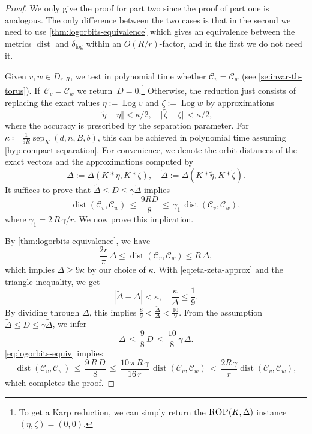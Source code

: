 \documentclass[a4paper,USenglish,cleveref,numberwithinsect]{lipics-v2021}
\DeclareMathOperator{\sep}{sep}
\DeclareMathOperator{\Log}{Log}
\DeclareMathOperator{\dist}{dist}
\newcommand{\distLD}{\delta_{\log}}
\newcommand{\KK}{\ensuremath{\mathcal{C}}}
\numberwithin{equation}{section}
\begin{document}
\begin{proof}
We only give the proof for part two since the proof of part one
is analogous. The only difference between the two cases is that in the second we need to use \cref{thm:logorbits-equivalence} which gives an equivalence between the metrics $\dist$ and $\distLD$ within an $O(R/r)$-factor, and in the first we do not need it. %

Given $v,w\in D_{r,R}$, we test in polynomial time whether
$\KK_v=\KK_w$ (see \cref{se:invar-th-torus}). %
If~$\KK_v=\KK_w$ we return~$D=0$.\footnote{To get a Karp reduction, we can simply return the $\textsc{ROP}(K,\Delta)$ instance $(\eta,\zeta)=(0,0)$.}
Otherwise, the reduction just consists of replacing the exact values
$\eta:=\Log v$ and $\zeta:=\Log w$
by approximations
\begin{equation}\label{eq:eta-zeta-approx}
  \Vert \tilde{\eta} - \eta\Vert< \kappa/2, \quad \Vert \tilde{\zeta} -\zeta\Vert < \kappa/2 ,
\end{equation}
where the accuracy is prescribed by the separation parameter.
For $\kappa\coloneqq \frac{1}{9R}\sep_K(d,n,B,b)$,
this can be achieved in polynomial time
assuming \cref{hyp:compact-separation}.
For convenience, we denote the orbit distances of the exact vectors
and the approximations computed by
$$
 \Delta:= \Delta(K\ast\eta, K\ast\zeta), \quad
 \tilde{\Delta} := \Delta(K\ast\tilde{\eta}, K\ast\tilde{\zeta}) .
$$
It suffices to prove that
$\tilde{\Delta} \leq D\leq \gamma \tilde{\Delta}$
implies
\[
  \dist(\KK_v,\KK_w) \, \leq \, \frac{9RD}8 \, \leq \, \gamma_1\, \dist(\KK_v,\KK_w),
\]
where $\gamma_1= 2\,R\,\gamma/r$.
We now prove this implication.

By \cref{thm:logorbits-equivalence},
we have %
\begin{equation}\label{eq:logorbits-equiv}
  \frac{2r}{\pi} \, \Delta \leq \dist(\KK_v,\KK_w)
    \leq R \, \Delta ,
\end{equation}
which implies $\Delta \ge 9 \kappa$ by our choice of $\kappa$.
With \cref{eq:eta-zeta-approx} and
the triangle inequality, we get
\begin{equation*} %
	| \tilde{\Delta} - \Delta | < \kappa, \quad \frac{\kappa}{\Delta} \le \frac{1}{9} .
\end{equation*}
By dividing through $\Delta$,
this implies
$\frac{8}{9} <\frac{\tilde{\Delta}}{\Delta} < \frac{10}{9}$.
From the assumption
$\tilde{\Delta} \leq D\leq \gamma \tilde{\Delta}$,
we infer
\[
  \Delta \, \leq \, \frac{9}{8} \, D \, \leq \, \frac{10}{8}\, \gamma \, \Delta .
\]
\cref{eq:logorbits-equiv} implies
\[
 \dist(\KK_v,\KK_w)\,  \leq \, \frac{ 9\, R  \, D}{8} \, \leq \,
 \frac{10\, \pi \, R \, \gamma}{16 \, r} \,\dist(\KK_v,\KK_w) \, <\, \frac{2 R\, \gamma}{r} \dist(\KK_v,\KK_w),
\]
which completes the proof.
\end{proof}
\end{document}
